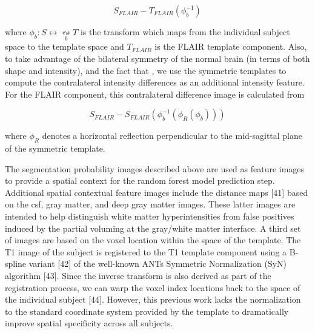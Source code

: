 \documentclass[11pt,]{article}
\begin{document}
\[S_{FLAIR} - T_{FLAIR}\left(\phi_b^{-1}\right)\]

where \(\phi_b: S \leftrightarrow \underset{b}{\leftrightsquigarrow} T\)
is the transform which maps from the individual subject space to the
template space and \(T_{FLAIR}\) is the FLAIR template component. Also,
to take advantage of the
bilateral symmetry of the normal brain (in terms of both shape and
intensity), and the fact that
,
we use the symmetric templates to compute the contralateral intensity
differences as an additional intensity feature. For the FLAIR component,
this contralateral difference image is calculated from

\[S_{FLAIR} - S_{FLAIR}\left(\phi_b^{-1}\left(\phi_R\left(\phi_b\right)\right)\right)\]

where \(\phi_R\) denotes a horizontal reflection perpendicular to the
mid-sagittal plane of the symmetric template.

The segmentation probability images described above are used as feature
images to provide a spatial context for the random forest model
prediction step. Additional spatial contextual feature images include
the distance maps {[}41{]} based on the csf, gray matter, and deep gray
matter images. These latter images are intended to help distinguish
white matter hyperintensities from false positives induced by the
partial voluming at the gray/white matter interface. A third set of
images are based on the voxel location within the space of the template.
The T1 image of the subject is registered to the T1 template component
using a B-spline variant {[}42{]} of the well-known ANTs Symmetric
Normalization (SyN) algorithm {[}43{]}. Since the inverse transform is
also derived as part of the registration process, we can warp the voxel
index locations back to the space of the individual subject
 {[}44{]}. However, this previous work lacks the normalization to the
standard coordinate system provided by the template to dramatically
improve spatial specificity across all subjects.
\end{document}
